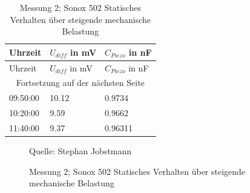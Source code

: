 \documentclass[12pt]{scrreprt} %
\begin{document}
\setlongtables
\begin{longtable}{| l | l | l |}
\caption[Messung 2; Sonox 502 Statisches Verhalten]{Messung 2; Sonox 502 Statisches Verhalten über steigende mechanische Belastung}\\
\hline
Uhrzeit&$U_{diff}$ in mV&$C_{Piezo}$ in nF\\
\hline
\endfirsthead
\hline
Uhrzeit&$U_{diff}$ in mV&$C_{Piezo}$ in nF\\
\hline
\endhead
\hline
\multicolumn{3}{|c|}{Fortsetzung auf der nächsten Seite}\\
\hline
\endfoot
\hline \hline
\endlastfoot
\hline
\label{tab:2.2}%
09:50:00&10.12&0.9734\\
10:20:00&9.59&0.9662\\
11:40:00&9.37&0.96311\\
\end{longtable}

\begin {figure}[htbp]
\caption[Messung 2; Sonox 502 Statisches Verhalten]{Messung 2; Sonox 502 Statisches Verhalten über steigende mechanische Belastung}
      \begin{center}
      \end{center}
Quelle: Stephan Jobstmann
\label{fig:2.2}
\end{figure}
\newpage
\end{document}
